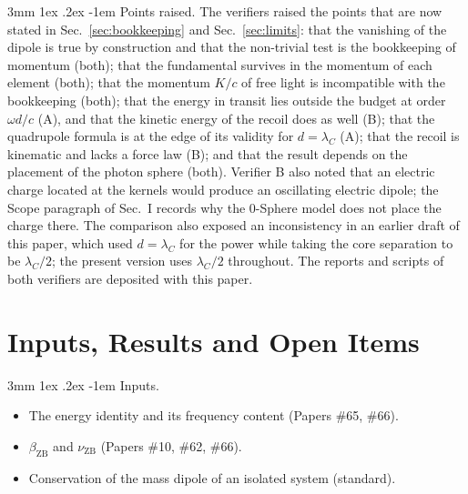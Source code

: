 \documentclass[%
 reprint, amsmath,amssymb, aps, prb, ]{revtex4-2}
\makeatletter
\numberwithin{equation}{section}
\renewcommand\paragraph{%
  \@startsection{paragraph}{4}{\z@}%
    {3mm \@plus 1ex \@minus .2ex}%
    {-1em}%
    {\normalfont\normalsize\itshape}}
\makeatother
\begin{document}
\paragraph{Points raised.} The verifiers raised the points that are now stated in Sec.~\ref{sec:bookkeeping} and Sec.~\ref{sec:limits}: that the vanishing of the dipole is true by construction and that the non-trivial test is the bookkeeping of momentum (both); that the fundamental survives in the momentum of each element (both); that the momentum $K/c$ of free light is incompatible with the bookkeeping (both); that the energy in transit lies outside the budget at order $\omega d/c$ (A), and that the kinetic energy of the recoil does as well (B); that the quadrupole formula is at the edge of its validity for $d = \lambda_C$ (A); that the recoil is kinematic and lacks a force law (B); and that the result depends on the placement of the photon sphere (both). Verifier B also noted that an electric charge located at the kernels would produce an oscillating electric dipole; the Scope paragraph of Sec.~I records why the 0-Sphere model does not place the charge there. The comparison also exposed an inconsistency in an earlier draft of this paper, which used $d = \lambda_C$ for the power while taking the core separation to be $\lambda_C/2$; the present version uses $\lambda_C/2$ throughout. The reports and scripts of both verifiers are deposited with this paper.

\section{Inputs, Results and Open Items}
\label{app:interface}

\paragraph{Inputs.}
\begin{itemize}[leftmargin=2.4em]
\item[I1.] The energy identity and its frequency content (Papers \#65, \#66).
\item[I2.] $\beta_{\text{ZB}}$ and $\nu_{\text{ZB}}$ (Papers \#10, \#62, \#66).
\item[I3.] Conservation of the mass dipole of an isolated system (standard).
\end{itemize}
\end{document}
